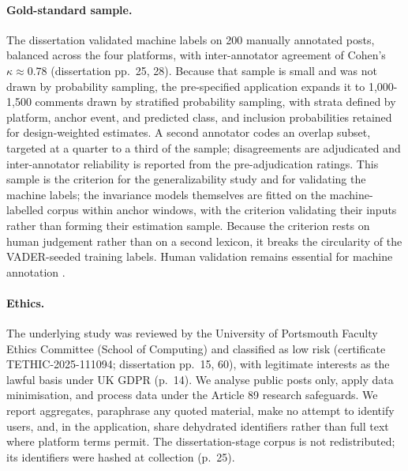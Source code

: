 \paragraph{Gold-standard sample.}
The dissertation validated machine labels on 200 manually annotated posts, balanced across the four platforms, with inter-annotator agreement of Cohen's $\kappa \approx 0.78$ (dissertation pp.~25, 28). Because that sample is small and was not drawn by probability sampling, the pre-specified application expands it to 1,000-1,500 comments drawn by stratified probability sampling, with strata defined by platform, anchor event, and predicted class, and inclusion probabilities retained for design-weighted estimates. A second annotator codes an overlap subset, targeted at a quarter to a third of the sample; disagreements are adjudicated and inter-annotator reliability is reported from the pre-adjudication ratings. This sample is the criterion for the generalizability study and for validating the machine labels; the invariance models themselves are fitted on the machine-labelled corpus within anchor windows, with the criterion validating their inputs rather than forming their estimation sample. Because the criterion rests on human judgement rather than on a second lexicon, it breaks the circularity of the VADER-seeded training labels. Human validation remains essential for machine annotation \citep{pangakis2025, atreja2025}.

\paragraph{Ethics.}
The underlying study was reviewed by the University of Portsmouth Faculty Ethics Committee (School of Computing) and classified as low risk (certificate TETHIC-2025-111094; dissertation pp.~15, 60), with legitimate interests as the lawful basis under UK GDPR (p.~14). We analyse public posts only, apply data minimisation, and process data under the Article 89 research safeguards. We report aggregates, paraphrase any quoted material, make no attempt to identify users, and, in the application, share dehydrated identifiers rather than full text where platform terms permit. The dissertation-stage corpus is not redistributed; its identifiers were hashed at collection (p.~25).

